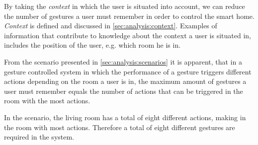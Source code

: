 By taking the \emph{context} in which the user is situated into account, we can reduce the number of gestures a user must remember in order to control the smart home. \emph{Context} is defined and discussed in \cref{sec:analysis:context}. Examples of information that contribute to knowledge about the context a user is situated in, includes the position of the user, e.g. which room he is in.

From the scenario presented in \cref{sec:analysis:scenarios} it is apparent, that in a gesture controlled system in which the performance of a gesture triggers different actions depending on the room a user is in, the maximum amount of gestures a user must remember equals the number of actions that can be triggered in the room with the most actions.

In the scenario, the living room has a total of eight different actions, making in the room with most actions. Therefore a total of eight different gestures are required in the system.

